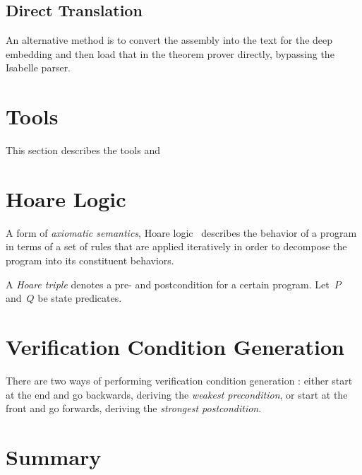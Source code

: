 
%
%



\subsection{Direct Translation}\label{sse:direct_translation}
An alternative method is to convert the assembly into the text for the deep embedding
and then load that in the theorem prover directly,
bypassing the Isabelle parser.

\section{Tools}
This section describes the tools and 


\section{Hoare Logic}\label{se:hoare}
A form of \emph{axiomatic semantics},
Hoare logic~\citep{hoare1969axiomatic,myreen2007hoare}%
describes the behavior of a program
in terms of a set of rules that are applied iteratively
in order to decompose the program into its constituent behaviors.

A \emph{Hoare triple} denotes a pre- and postcondition for a certain program.%
%
%
Let~$P$ and~$Q$ be state predicates.


\section{Verification Condition Generation}

There are two ways of performing verification condition generation%
:
either start at the end and go backwards, deriving the \emph{weakest precondition},%
or start at the front and go forwards, deriving the \emph{strongest postcondition}.%


\section{Summary}
